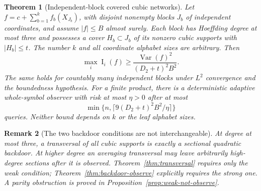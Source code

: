 \documentclass[11pt,letterpaper]{article}
\newtheorem{theorem}{Theorem}[section]
\newtheorem{remark}[theorem]{Remark}
\theoremstyle{definition}
\newcommand{\Var}{\operatorname{Var}}
\newcommand{\Inf}{\operatorname{I}}
\begin{document}
\begin{theorem}[Independent-block covered cubic networks]\label{thm:blocks}
Let $f=c+\sum_{b=1}^k f_b(X_{J_b})$, with disjoint nonempty blocks
$J_b$ of independent coordinates, and assume $|f|\le B$ almost surely.
Each block has Hoeffding degree at most three and possesses a cover
$H_b\subset J_b$ of its nonzero cubic supports with $|H_b|\le t$.
The number $k$ and all coordinate alphabet sizes are arbitrary. Then
\begin{equation}\label{eq:blocks}
\boxed{\max_i\Inf_i(f)\ge\frac{\Var(f)^2}{(D_2+t)^2B^2}.}
\end{equation}
The same holds for countably many independent blocks under $L^2$
convergence and the boundedness hypothesis. For a finite product,
there is a deterministic adaptive whole-symbol observer with risk at
most $\eta>0$ after at most
\begin{equation}\label{eq:blocks-queries}
\boxed{\min\{n,\lceil9(D_2+t)^2B^2/\eta\rceil\}}
\end{equation}
queries. Neither bound depends on $k$ or the leaf alphabet sizes.
\end{theorem}
\begin{remark}[The two backdoor conditions are not interchangeable]
At degree at most three, a transversal of all cubic supports is
exactly a sectional quadratic backdoor. At higher degree an averaging
transversal may leave arbitrarily high-degree sections after it is
observed. Theorem~\ref{thm:transversal} requires only the weak condition;
Theorem~\ref{thm:backdoor-observe} explicitly requires the strong one.
A parity obstruction is proved in Proposition~\ref{prop:weak-not-observe}.
\end{remark}
\end{document}
